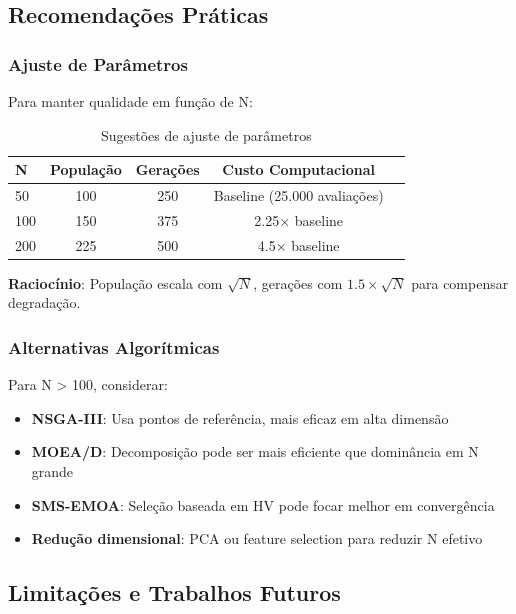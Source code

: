 \subsection{Recomendações Práticas}

\subsubsection{Ajuste de Parâmetros}

Para manter qualidade em função de N:

\begin{table}[H]
\centering
\caption{Sugestões de ajuste de parâmetros}
\begin{tabular}{@{}lcccc@{}}
\toprule
\textbf{N} & \textbf{População} & \textbf{Gerações} & \textbf{Custo Computacional} \\
\midrule
50  & 100 & 250 & Baseline (25.000 avaliações) \\
100 & 150 & 375 & 2.25× baseline \\
200 & 225 & 500 & 4.5× baseline \\
\bottomrule
\end{tabular}
\end{table}

\textbf{Raciocínio}: População escala com $\sqrt{N}$, gerações com $1.5 \times \sqrt{N}$ para compensar degradação.

\subsubsection{Alternativas Algorítmicas}

Para N > 100, considerar:

\begin{itemize}
    \item \textbf{NSGA-III}: Usa pontos de referência, mais eficaz em alta dimensão
    \item \textbf{MOEA/D}: Decomposição pode ser mais eficiente que dominância em N grande
    \item \textbf{SMS-EMOA}: Seleção baseada em HV pode focar melhor em convergência
    \item \textbf{Redução dimensional}: PCA ou feature selection para reduzir N efetivo
\end{itemize}

\subsection{Limitações e Trabalhos Futuros}


